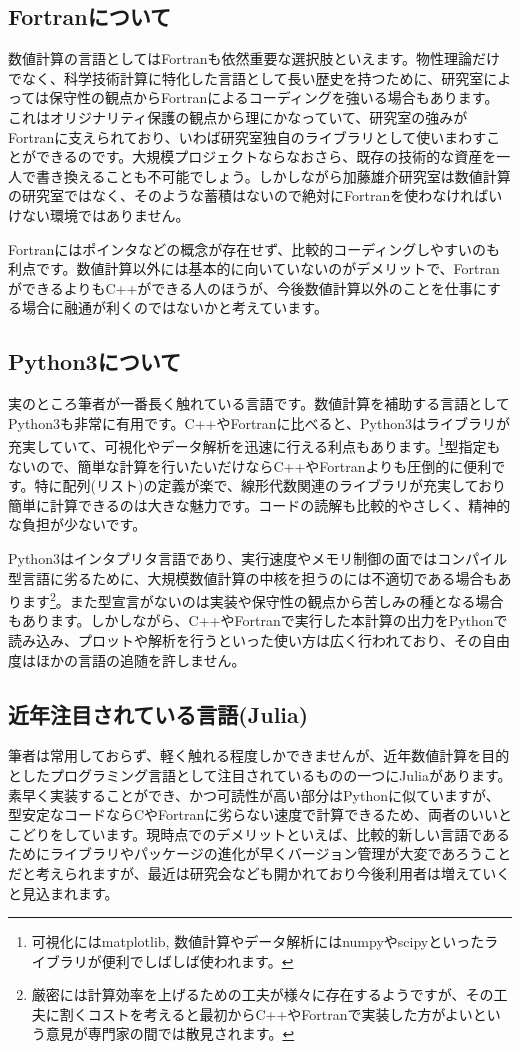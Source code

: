 \documentclass[12pt]{jreport}
\begin{document}
\subsection{Fortranについて}
数値計算の言語としてはFortranも依然重要な選択肢といえます。物性理論だけでなく、科学技術計算に特化した言語として長い歴史を持つために、研究室によっては保守性の観点からFortranによるコーディングを強いる場合もあります。これはオリジナリティ保護の観点から理にかなっていて、研究室の強みがFortranに支えられており、いわば研究室独自のライブラリとして使いまわすことができるのです。大規模プロジェクトならなおさら、既存の技術的な資産を一人で書き換えることも不可能でしょう。しかしながら加藤雄介研究室は数値計算の研究室ではなく、そのような蓄積はないので絶対にFortranを使わなければいけない環境ではありません。

Fortranにはポインタなどの概念が存在せず、比較的コーディングしやすいのも利点です。数値計算以外には基本的に向いていないのがデメリットで、FortranができるよりもC++ができる人のほうが、今後数値計算以外のことを仕事にする場合に融通が利くのではないかと考えています。

\subsection{Python3について}
実のところ筆者が一番長く触れている言語です。数値計算を補助する言語としてPython3も非常に有用です。C++やFortranに比べると、Python3はライブラリが充実していて、可視化やデータ解析を迅速に行える利点もあります。\footnote{可視化にはmatplotlib, 数値計算やデータ解析にはnumpyやscipyといったライブラリが便利でしばしば使われます。
}型指定もないので、簡単な計算を行いたいだけならC++やFortranよりも圧倒的に便利です。特に配列(リスト)の定義が楽で、線形代数関連のライブラリが充実しており簡単に計算できるのは大きな魅力です。コードの読解も比較的やさしく、精神的な負担が少ないです。

Python3はインタプリタ言語であり、実行速度やメモリ制御の面ではコンパイル型言語に劣るために、大規模数値計算の中核を担うのには不適切である場合もあります\footnote{厳密には計算効率を上げるための工夫が様々に存在するようですが、その工夫に割くコストを考えると最初からC++やFortranで実装した方がよいという意見が専門家の間では散見されます。}。また型宣言がないのは実装や保守性の観点から苦しみの種となる場合もあります。しかしながら、C++やFortranで実行した本計算の出力をPythonで読み込み、プロットや解析を行うといった使い方は広く行われており、その自由度はほかの言語の追随を許しません。

\subsection{近年注目されている言語(Julia)}
筆者は常用しておらず、軽く触れる程度しかできませんが、近年数値計算を目的としたプログラミング言語として注目されているものの一つにJuliaがあります。素早く実装することができ、かつ可読性が高い部分はPythonに似ていますが、型安定なコードならCやFortranに劣らない速度で計算できるため、両者のいいとこどりをしています。現時点でのデメリットといえば、比較的新しい言語であるためにライブラリやパッケージの進化が早くバージョン管理が大変であろうことだと考えられますが、最近は研究会なども開かれており今後利用者は増えていくと見込まれます。
\end{document}
